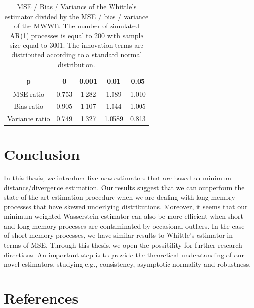 \documentclass[
  11pt,
]{article}
\begin{document}
\begin{table}[h]
\centering
\begin{tabular}{|c|c|c|c|c|}
\hline
p  &  0  & 0.001   & 0.01    & 0.05 \\
\hline
MSE ratio  & 0.753 & 1.282 & 1.089 & 1.010 \\
\hline
Bias ratio & 0.905 & 1.107 & 1.044 & 1.005\\
\hline 
Variance ratio & 0.749 & 1.327 & 1.0589 & 0.813 \\ 
\hline
\end{tabular}
\caption{MSE / Bias / Variance of the Whittle's estimator divided by the MSE / bias / variance of the MWWE. The number of simulated AR(1) processes is equal to 200 with sample size equal to 3001. The innovation terms are distributed according to a standard normal distribution.}
\label{tab:outliers_AR1}
\end{table}

\hypertarget{conclusion}{%
\section{Conclusion}\label{conclusion}}

In this thesis, we introduce five new estimators that are based on
minimum distance/divergence estimation. Our results suggest that we can
outperform the state-of-the art estimation procedure when we are dealing
with long-memory processes that have skewed underlying distributions.
Moreover, it seems that our minimum weighted Wasserstein estimator can
also be more efficient when short- and long-memory processes are
contaminated by occasional outliers. In the case of short memory
processes, we have similar results to Whittle's estimator in terms of
MSE. Through this thesis, we open the possibility for further research
directions. An important step is to provide the theoretical
understanding of our novel estimators, studying e.g., consistency,
asymptotic normality and robustness.

\newpage

\hypertarget{references}{%
\section*{References}\label{references}}
\end{document}
